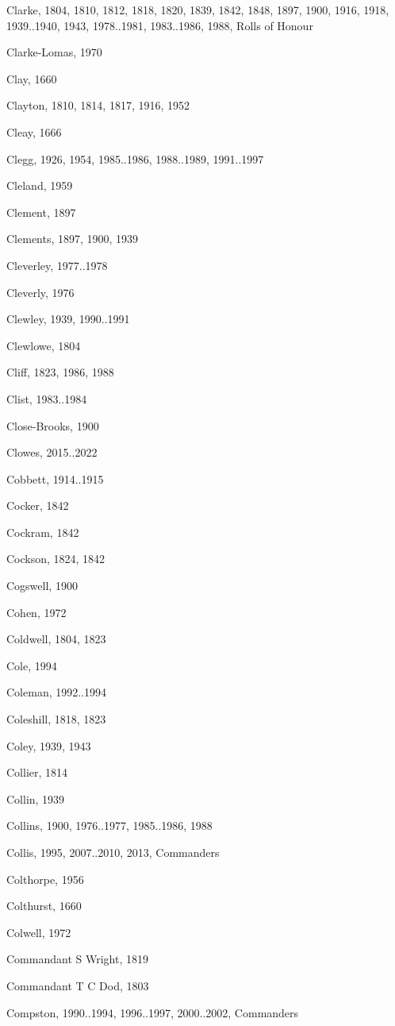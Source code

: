 \begin{theindex}
\item Clarke, 1804, 1810, 1812, 1818, 1820, 1839, 1842, 1848, 1897, 1900, 1916, 1918, 1939..1940, 1943, 1978..1981, 1983..1986, 1988, Rolls of Honour
\item Clarke-Lomas, 1970
\item Clay, 1660
\item Clayton, 1810, 1814, 1817, 1916, 1952
\item Cleay, 1666
\item Clegg, 1926, 1954, 1985..1986, 1988..1989, 1991..1997
\item Cleland, 1959
\item Clement, 1897
\item Clements, 1897, 1900, 1939
\item Cleverley, 1977..1978
\item Cleverly, 1976
\item Clewley, 1939, 1990..1991
\item Clewlowe, 1804
\item Cliff, 1823, 1986, 1988
\item Clist, 1983..1984
\item Close-Brooks, 1900
\item Clowes, 2015..2022
\item Cobbett, 1914..1915
\item Cocker, 1842
\item Cockram, 1842
\item Cockson, 1824, 1842
\item Cogswell, 1900
\item Cohen, 1972
\item Coldwell, 1804, 1823
\item Cole, 1994
\item Coleman, 1992..1994
\item Coleshill, 1818, 1823
\item Coley, 1939, 1943
\item Collier, 1814
\item Collin, 1939
\item Collins, 1900, 1976..1977, 1985..1986, 1988
\item Collis, 1995, 2007..2010, 2013, Commanders
\item Colthorpe, 1956
\item Colthurst, 1660
\item Colwell, 1972
\item Commandant S Wright, 1819
\item Commandant T C Dod, 1803
\item Compston, 1990..1994, 1996..1997, 2000..2002, Commanders

\end{theindex}
